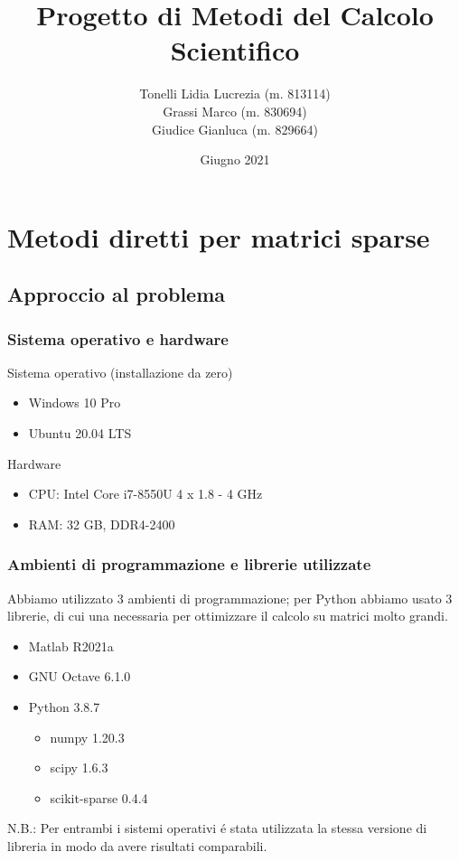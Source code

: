 \documentclass{beamer}
\title{Progetto di Metodi del Calcolo Scientifico} %
\author{Tonelli Lidia Lucrezia (m. 813114)\\
Grassi Marco (m. 830694)\\
Giudice Gianluca (m. 829664)
} %
\institute[University of Milano Bicocca] %
{
University of Milano Bicocca \\ %
\medskip
}
\date{Giugno 2021} %
\begin{document}
\begin{frame}
\titlepage %
\end{frame}


\section{Metodi diretti per matrici sparse}

\subsection{Approccio al problema}

\begin{frame}

	\frametitle{Sistema operativo e hardware }
	Sistema operativo (installazione da zero)
	\begin{itemize}
		\item Windows 10 Pro
		\item Ubuntu 20.04 LTS
	\end{itemize}

	Hardware
	\begin{itemize}
		\item CPU: Intel Core i7-8550U 4 x 1.8 - 4 GHz
		\item RAM: 32 GB, DDR4-2400
	\end{itemize}
\end{frame}


\begin{frame}

	\frametitle{Ambienti di programmazione e librerie utilizzate}
	Abbiamo utilizzato 3 ambienti di programmazione; per Python abbiamo usato 3 librerie, di cui una necessaria per ottimizzare il calcolo su matrici molto grandi.
	\begin{itemize}
		\item Matlab  R2021a
		\item GNU Octave 6.1.0
		\item Python 3.8.7
		\begin{itemize}
			\item numpy 1.20.3
			\item scipy 1.6.3
			\item scikit-sparse 0.4.4
		\end{itemize}
	\end{itemize}
	N.B.: Per entrambi i sistemi operativi \'e stata utilizzata la stessa versione di libreria in modo da avere risultati comparabili.
\end{frame}
\end{document}
